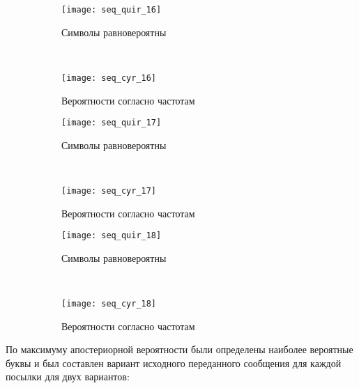 \begin{figure}[H]
\begin{center}
	\begin{subfigure}[b]{0.45\textwidth}
		\texttt{[image: seq\_quir\_16]}
		\caption{Символы равновероятны}
	\end{subfigure}
	~
	\begin{subfigure}[b]{0.45\textwidth}
		\texttt{[image: seq\_cyr\_16]}
		\caption{Вероятности согласно частотам}
	\end{subfigure}
	\caption{}
\end{center}
\end{figure}

\begin{figure}[H]
\begin{center}
	\begin{subfigure}[b]{0.45\textwidth}
		\texttt{[image: seq\_quir\_17]}
		\caption{Символы равновероятны}
	\end{subfigure}
	~
	\begin{subfigure}[b]{0.45\textwidth}
		\texttt{[image: seq\_cyr\_17]}
		\caption{Вероятности согласно частотам}
	\end{subfigure}
	\caption{}
\end{center}
\end{figure}

\begin{figure}[H]
\begin{center}
	\begin{subfigure}[b]{0.45\textwidth}
		\texttt{[image: seq\_quir\_18]}
		\caption{Символы равновероятны}
	\end{subfigure}
	~
	\begin{subfigure}[b]{0.45\textwidth}
		\texttt{[image: seq\_cyr\_18]}
		\caption{Вероятности согласно частотам}
	\end{subfigure}
	\caption{}
	\label{pic:3:18}
\end{center}
\end{figure}

По максимуму апостериорной вероятности были определены наиболее вероятные буквы и был составлен вариант исходного переданного сообщения для каждой посылки для двух вариантов:

